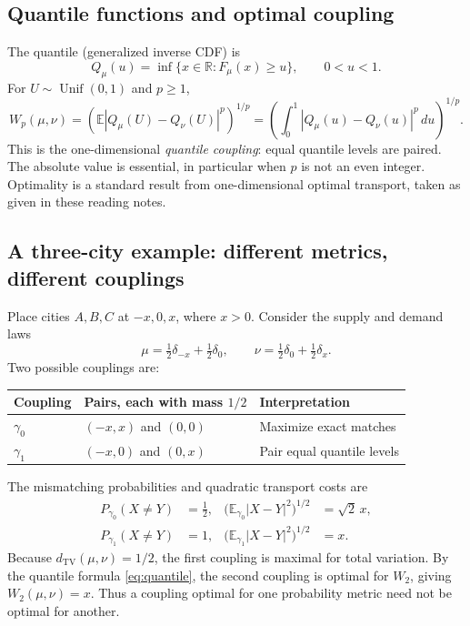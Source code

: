 \documentclass[10pt,a4paper]{article}
\newcommand{\R}{\mathbb R}\newcommand{\E}{\mathbb E}\newcommand{\N}{\mathbb N}
\newcommand{\TV}{d_{\mathrm{TV}}}
\begin{document}
\subsection*{Quantile functions and optimal coupling}
The quantile (generalized inverse CDF) is
\[
Q_\mu(u)=\inf\{x\in\R:F_\mu(x)\ge u\},\qquad0<u<1.
\]
For $U\sim\operatorname{Unif}(0,1)$ and $p\ge1$,
\begin{equation}\label{eq:quantile}
W_p(\mu,\nu)
=\left(\E\left|Q_\mu(U)-Q_\nu(U)\right|^p\right)^{1/p}
=\left(\int_0^1|Q_\mu(u)-Q_\nu(u)|^p\,du\right)^{1/p}.
\end{equation}
This is the one-dimensional \emph{quantile coupling}: equal quantile levels are paired. The absolute value is essential, in particular when $p$ is not an even integer. Optimality is a standard result from one-dimensional optimal transport, taken as given in these reading notes.

\subsection*{A three-city example: different metrics, different couplings}
Place cities $A,B,C$ at $-x,0,x$, where $x>0$. Consider the supply and demand laws
\[
\mu=\tfrac12\delta_{-x}+\tfrac12\delta_0,
\qquad\nu=\tfrac12\delta_0+\tfrac12\delta_x.
\]
Two possible couplings are:
\begin{center}
\begin{tabular}{@{}lll@{}}\toprule
Coupling & Pairs, each with mass $1/2$ & Interpretation\\ \midrule
$\gamma_0$ & $(-x,x)$ and $(0,0)$ & Maximize exact matches\\
$\gamma_1$ & $(-x,0)$ and $(0,x)$ & Pair equal quantile levels\\ \bottomrule
\end{tabular}
\end{center}
The mismatching probabilities and quadratic transport costs are
\begin{align*}
P_{\gamma_0}(X\ne Y)&=\tfrac12,&
\bigl(\E_{\gamma_0}|X-Y|^2\bigr)^{1/2}&=\sqrt2\,x,\\
P_{\gamma_1}(X\ne Y)&=1,&
\bigl(\E_{\gamma_1}|X-Y|^2\bigr)^{1/2}&=x.
\end{align*}
Because $\TV(\mu,\nu)=1/2$, the first coupling is maximal for total variation. By the quantile formula \eqref{eq:quantile}, the second coupling is optimal for $W_2$, giving $W_2(\mu,\nu)=x$. Thus a coupling optimal for one probability metric need not be optimal for another.
\end{document}
